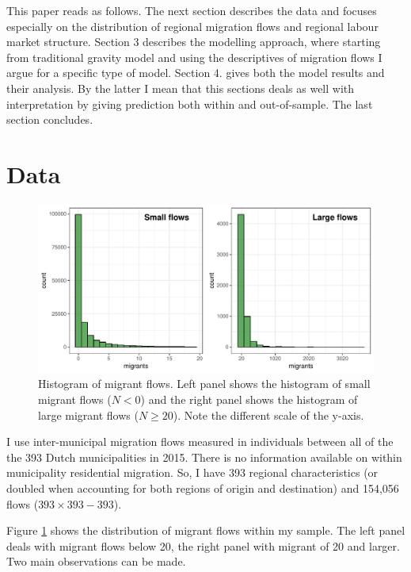 \documentclass[fleqn,10pt]{SelfArx} %
\begin{document}
        This paper reads as follows. The next section describes the
        data and focuses especially on the distribution of regional
        migration flows and regional labour market structure. Section
        3 describes the modelling approach, where starting from
        traditional gravity model and using the descriptives of
        migration flows I argue for a specific type of model. Section
        4. gives both the model results and their analysis. By the
        latter I mean that this sections deals as well with
        interpretation by giving prediction both within and
        out-of-sample. The last section concludes.

        \section{Data}

        \begin{figure}[ht!]\centering %
          \includegraphics[width=0.8\linewidth]{../fig/hist_mig.pdf}
          \caption{Histogram of migrant flows. Left panel shows the
            histogram of small migrant flows ($N<0$) and the right
            panel shows the histogram of large migrant flows
            ($N \geq 20$). Note the different scale of the y-axis.}
          \label{fig:hist_mig}
        \end{figure}


        I use inter-municipal migration flows measured in individuals
        between all of the the 393 Dutch municipalities in 2015. There
        is no information available on within municipality residential
        migration. So, I have 393 regional characteristics (or doubled
        when accounting for both regions of origin and destination)
        and 154,056 flows ($393 \times 393 - 393$).

        Figure \ref{fig:hist_mig} shows the distribution of migrant
        flows within my sample. The left panel deals with migrant
        flows below 20, the right panel with migrant of 20 and
        larger. Two main observations can be made.
\end{document}
